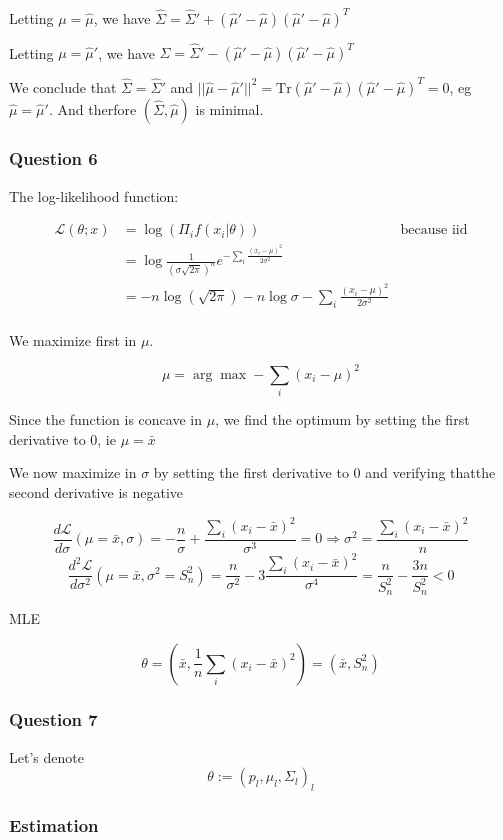 \documentclass[12pt]{article}
\newcommand{\Q}[1]{\subsubsection*{Question #1}}
\begin{document}
Letting $\mu = \hat \mu$, we have $\hat \Sigma = \hat \Sigma' + (\hat \mu' - \hat \mu)(\hat \mu' - \hat \mu)^T$


Letting $\mu = \hat \mu'$, we have $\hat \Sigma = \hat \Sigma' - (\hat \mu' - \hat \mu)(\hat \mu' - \hat \mu)^T$


We conclude that $\hat \Sigma = \hat \Sigma'$ and $|| \hat \mu - \hat \mu'||^2 = \text{Tr}(\hat \mu' - \hat \mu)(\hat \mu' - \hat \mu)^T = 0$, eg $\hat \mu = \hat \mu'$. 
And therfore $(\hat \Sigma, \hat \mu)$ is minimal.




\Q{6}
The log-likelihood function:

\begin{align}
\mathcal{L}(\theta; x) &= \log(\Pi_i f(x_i | \theta)) & \text{because iid}\\
&= \log\frac{1}{(\sigma \sqrt{2\pi})^n} e^{-\sum_i \frac{(x_i-\mu)^2}{2\sigma^2}} \\
&= -n\log(\sqrt{2\pi}) - n \log \sigma -\sum_i \frac{(x_i-\mu)^2}{2\sigma^2} \\
\end{align}


We maximize first in $\mu$. 

$$\mu = \arg\max -\sum_i (x_i-\mu)^2$$

Since the function is concave in $\mu$, we find the optimum by setting the first derivative to 0, ie $\mu = \bar x$

We now maximize in $\sigma$ by setting the first derivative to $0$ and verifying thatthe second derivative is negative

$$\frac{d \mathcal{L}}{d \sigma}(\mu = \bar x, \sigma) = -\frac{n}{\sigma} + \frac{\sum_i (x_i-\bar x)^2}{\sigma^3} = 0 \Rightarrow \sigma^2 = \frac{\sum_i (x_i - \bar x)^2} n$$
$$\frac{d^2 \mathcal{L}}{d \sigma^2}(\mu = \bar x, \sigma^2 = S_n^2) = \frac{n}{\sigma^2} - 3 \frac{\sum_i (x_i-\bar x)^2}{\sigma^4} = \frac n {S_n^2} - \frac{3n} {S_n^2} < 0 $$

MLE

$$\theta = (\bar x, \frac1n \sum_i (x_i - \bar x)^2) = (\bar x, S_n^2)$$



\Q{7}

Let's denote
$$\theta := (p_l, \mu_l, \Sigma_l)_l$$

\subsubsection*{Estimation}
\end{document}
